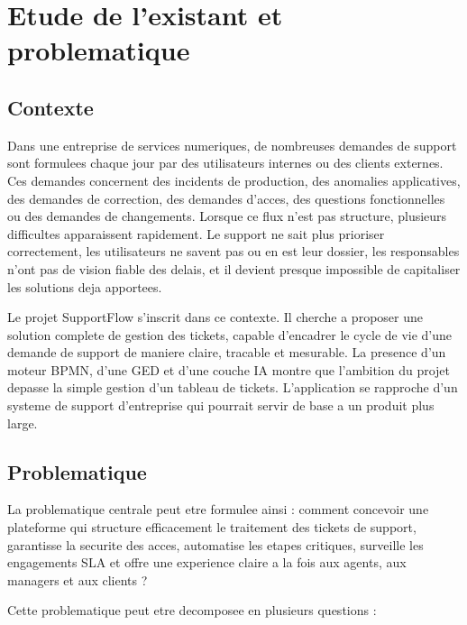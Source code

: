 ﻿\chapter{Etude de l'existant et problematique}

\section{Contexte}

Dans une entreprise de services numeriques, de nombreuses demandes de support sont formulees chaque jour par des utilisateurs internes ou des clients externes. Ces demandes concernent des incidents de production, des anomalies applicatives, des demandes de correction, des demandes d'acces, des questions fonctionnelles ou des demandes de changements. Lorsque ce flux n'est pas structure, plusieurs difficultes apparaissent rapidement. Le support ne sait plus prioriser correctement, les utilisateurs ne savent pas ou en est leur dossier, les responsables n'ont pas de vision fiable des delais, et il devient presque impossible de capitaliser les solutions deja apportees.

Le projet SupportFlow s'inscrit dans ce contexte. Il cherche a proposer une solution complete de gestion des tickets, capable d'encadrer le cycle de vie d'une demande de support de maniere claire, tracable et mesurable. La presence d'un moteur BPMN, d'une GED et d'une couche IA montre que l'ambition du projet depasse la simple gestion d'un tableau de tickets. L'application se rapproche d'un systeme de support d'entreprise qui pourrait servir de base a un produit plus large.

\section{Problematique}

La problematique centrale peut etre formulee ainsi : comment concevoir une plateforme qui structure efficacement le traitement des tickets de support, garantisse la securite des acces, automatise les etapes critiques, surveille les engagements SLA et offre une experience claire a la fois aux agents, aux managers et aux clients ?

Cette problematique peut etre decomposee en plusieurs questions :

